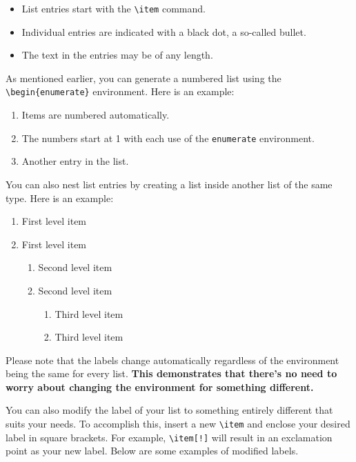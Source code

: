 \begin{itemize}
  \item List entries start with the \verb|\item| command.
  \item Individual entries are indicated with a black dot, a so-called bullet.
  \item The text in the entries may be of any length.
\end{itemize}

As mentioned earlier, you can generate a numbered list using the \verb|\begin{enumerate}| environment. Here is an example:

\begin{enumerate}
  \item Items are numbered automatically.
  \item The numbers start at 1 with each use of the \verb|enumerate| environment.
  \item Another entry in the list.
\end{enumerate}

You can also nest list entries by creating a list inside another list of the same type. Here is an example:

\begin{enumerate}
    \item First level item
    \item First level item
    \begin{enumerate}
        \item Second level item
        \item Second level item
    \begin{enumerate}
        \item Third level item
        \item Third level item
    \end{enumerate}
    \end{enumerate}
\end{enumerate}

\begin{block}[tip]
Please note that the labels change automatically regardless of the environment being the same for every list. \textbf{This demonstrates that there's no need to worry about changing the environment for something different.}
\end{block}

You can also modify the label of your list to something entirely different that suits your needs. To accomplish this, insert a new \verb|\item| and enclose your desired label in square brackets. For example, \verb|\item[!]| will result in an exclamation point as your new label. Below are some examples of modified labels.

